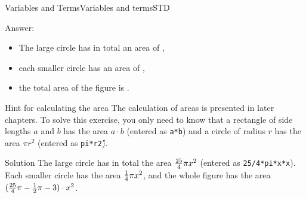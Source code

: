 \begin{MXContent}{Variables and Terms}{Variables and terms}{STD}
\begin{MExercise}
Answer:
\begin{itemize}
\item{The large circle has in total an area of ,}
\item{each smaller circle has an area of ,}
\item{the total area of the figure is .}
\end{itemize}

\begin{MHint}{Hint for calculating the area}
The calculation of areas is presented in later chapters. To solve this exercise, you only need to know that
a rectangle of side lengths $a$ and $b$ has the area $a\cdot b$ (entered as \texttt{a*b}) and  
a circle of radius $r$ has the area $\pi r^2$ (entered as \texttt{pi*r\^2}).
\end{MHint}

\begin{MHint}{Solution}
The large circle has in total the area $\tfrac{25}{4}\pi x^2$ (entered as \texttt{25/4*pi*x*x}).
Each smaller circle has the area $\tfrac{1}{4}\pi x^2$, and the whole figure has the area 
$(\tfrac{25}{4}\pi-\tfrac{1}{2}\pi-3)\cdot x^2$.
\end{MHint}
\end{MExercise}

\end{MXContent}

